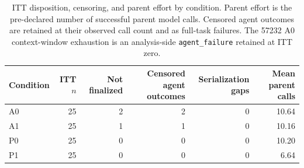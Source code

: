 \begin{table}[ht]
\centering
\caption{ITT disposition, censoring, and parent effort by condition.
  Parent effort is the pre-declared number of successful parent model calls.
  Censored agent outcomes are retained at their observed call count and as
  full-task failures. The 57232 A0 context-window exhaustion is an
  analysis-side \texttt{agent\_failure} retained at ITT zero.}
\label{tab:itt_disposition}
\begin{tabular}{lrrrrr}
\toprule
Condition & ITT $n$ & Not finalized & Censored agent outcomes &
Serialization gaps & Mean parent calls \\
\midrule
  A0 & 25 & 2 & 2 & 0 & 10.64 \\
  A1 & 25 & 1 & 1 & 0 & 10.16 \\
  P0 & 25 & 0 & 0 & 0 & 10.20 \\
  P1 & 25 & 0 & 0 & 0 & 6.64 \\
\bottomrule
\end{tabular}
\end{table}
